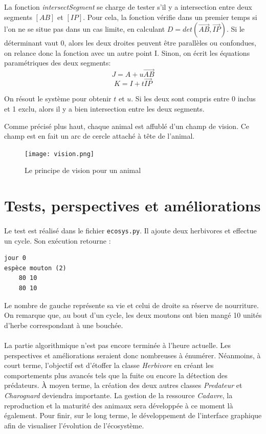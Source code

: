 \documentclass[a4paper,11pt,final,oneside]{article}
\begin{document}
La fonction \textit{intersectSegment} se charge de tester s'il y a intersection entre deux segments $[AB]$ et $[IP]$. Pour cela, la fonction vérifie dans un premier temps si l'on ne se situe pas dans un cas limite, en calculant $D = det(\overrightarrow{AB}, \overrightarrow{IP})$. Si le déterminant vaut 0, alors les deux droites peuvent être parallèles ou confondues, on relance donc la fonction avec un autre point I. Sinon, on écrit les équations paramétriques des deux segments:
\[J = A + u\overrightarrow{AB}\]
\[K = I + t\overrightarrow{IP}\]

On résout le système pour obtenir $t$ et $u$. Si les deux sont compris entre 0 inclus et 1 exclu, alors il y a bien intersection entre les deux segments.

Comme précisé plus haut, chaque animal est affublé d'un champ de vision. Ce champ est en fait un arc de cercle attaché à tête de l'animal.

\begin{center}
\begin{figure}[h!]
	\texttt{[image: vision.png]}
	\caption{Le principe de vision pour un animal}
	\label{vision}
\end{figure}
\end{center}
		
	\section{Tests, perspectives et améliorations}
	\label{sec:tes}
\paragraph{} Le test est réalisé dans le fichier \texttt{ecosys.py}. Il ajoute deux herbivores et effectue un cycle. Son exécution retourne :

\begin{lstlisting}
jour 0
espèce mouton (2)
	80 10
	80 10
\end{lstlisting}

Le nombre de gauche représente sa vie et celui de droite sa réserve de nourriture. On remarque que, au bout d'un cycle, les deux moutons ont bien mangé 10 unités d'herbe correspondant à une bouchée.

\paragraph{} La partie algorithmique n'est pas encore terminée à l'heure actuelle. Les perspectives et améliorations seraient donc nombreuses à énumérer. Néanmoins, à court terme, l'objectif est d'étoffer la classe \textit{Herbivore} en créant les comportements plus avancés tels que la fuite ou encore la détection des prédateurs. À moyen terme, la création des deux autres classes \textit{Predateur} et \textit{Charognard} deviendra importante. La gestion de la ressource \textit{Cadavre}, la reproduction et la maturité des animaux sera développée à ce moment là également. Pour finir, sur le long terme, le développement de l'interface graphique afin de visualiser l'évolution de l'écosystème.
\end{document}

